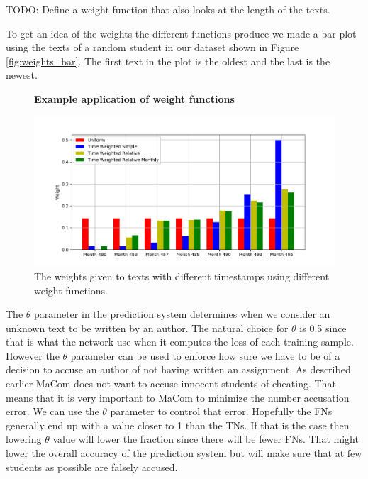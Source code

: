 TODO: Define a weight function that also looks at the length of the texts.

To get an idea of the weights the different functions produce we made a bar
plot using the texts of a random student in our dataset shown in Figure
\ref{fig:weights_bar}. The first text in the plot is the oldest and the last is
the newest.

\begin{figure}
    \centering
    \textbf{Example application of weight functions}\par\medskip
    \includegraphics[width=\textwidth]{./pictures/method/weight_bar.png}
    \caption{The weights given to texts with different timestamps using
        different weight functions.}
\end{figure}

The $\theta$ parameter in the prediction system determines when we consider an
unknown text to be written by an author. The natural choice for $\theta$ is 0.5
since that is what the network use when it computes the loss of each training
sample. However the $\theta$ parameter can be used to enforce how sure we have
to be of a decision to accuse an author of not having written an assignment. As
described earlier MaCom does not want to accuse innocent students of cheating.
That means that it is very important to MaCom to minimize the number accusation
error. We can use the $\theta$ parameter to control that error. Hopefully the
\gls{FN}s generally end up with a value closer to 1 than the \gls{TN}s. If that
is the case then lowering $\theta$ value will lower the fraction since there
will be fewer \gls{FN}s. That might lower the overall accuracy of the prediction
system but will make sure that at few students as possible are falsely accused.
